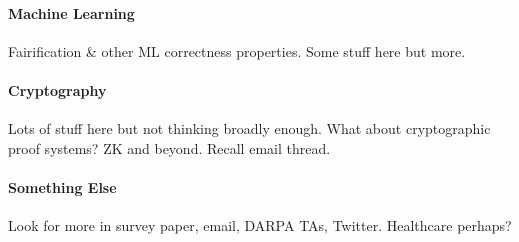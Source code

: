 \paragraph{Machine Learning} Fairification \& other ML correctness properties. Some stuff here but more.

\paragraph{Cryptography} Lots of stuff here but not thinking broadly enough. What about cryptographic proof systems? ZK and beyond. Recall email thread.

\paragraph{Something Else} Look for more in survey paper, email, DARPA TAs, Twitter. Healthcare perhaps? %
